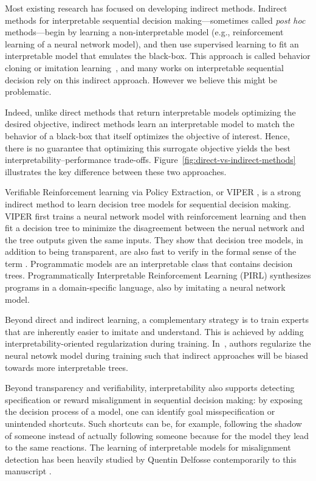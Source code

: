 Most existing research has focused on developing indirect methods. 
Indirect methods for interpretable sequential decision making—sometimes called \textit{post hoc} methods—begin by learning a non-interpretable model (e.g., reinforcement learning of a neural network model), and then use supervised learning to fit an interpretable model that emulates the black-box.
This approach is called behavior cloning or imitation learning~\cite{behavior-cloning,dagger}, and many works on interpretable sequential decision rely on this indirect approach\cite{viper,PIRL}.
However we believe this might be problematic.

Indeed, unlike direct methods that return interpretable models optimizing the desired objective, indirect methods learn an interpretable model to match the behavior of a black-box that itself optimizes the objective of interest. 
Hence, there is no guarantee that optimizing this surrogate objective yields the best interpretability–performance trade-offs. 
Figure~\ref{fig:direct-vs-indirect-methods} illustrates the key difference between these two approaches. 

Verifiable Reinforcement learning via Policy Extraction, or VIPER \cite{viper}, is a strong indirect method to learn decision tree models for sequential decision making. VIPER first trains a neural network model with reinforcement learning and then fit a decision tree to minimize the disagreement between the nerual network and the tree outputs given the same inputs.
They show that decision tree models, in addition to being transparent, are also fast to verify in the formal sense of the term \cite{maraboupy}.
Programmatic models are an interpretable class that contains decision trees. 
Programmatically Interpretable Reinforcement Learning (PIRL) \cite{PIRL} synthesizes programs in a domain-specific language, also by imitating a neural network model. 

Beyond direct and indirect learning, a complementary strategy is to train experts that are inherently easier to imitate and understand.
This is achieved by adding interpretability-oriented regularization during training. In~\cite{parbhoo}, authors regularize the neural netowk model during training such that indirect approaches will be biased towards more interpretable trees.

Beyond transparency and verifiability, interpretability also supports detecting specification or reward misalignment in sequential decision making: by exposing the decision process of a model, one can identify goal misspecification or unintended shortcuts.
Such shortcuts can be, for example, following the shadow of someone instead of actually following someone because for the model they lead to the same reactions.
The learning of interpretable models for misalignment detection has been heavily studied by Quentin Delfosse contemporarily to this manuscript \cite{scobots}\cite{shindo2024blendrl}\cite{nudge}\cite{ocatari}.

